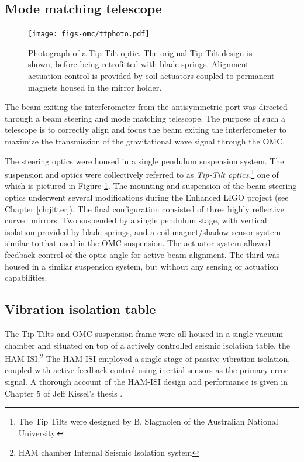 \subsection{Mode matching telescope}
\begin{figure}
  \begin{center}
  \leavevmode
  \texttt{[image: figs-omc/ttphoto.pdf]}
  \end{center}
  \caption[Photograph of a Tip Tilt optic.]{Photograph of a Tip Tilt optic. The original Tip Tilt design is shown, before being retrofitted with blade springs. Alignment actuation control is provided by coil actuators coupled to permanent magnets housed in the mirror holder. }
  \label{fig:ttphoto}
\end{figure}
The beam exiting the interferometer from the antisymmetric port was directed through a beam steering and mode matching telescope. %
The purpose of such a telescope is to correctly align and focus the beam exiting the interferometer to maximize the transmission of the gravitational wave signal through the OMC.

The steering optics were housed in a single pendulum suspension system. %
The suspension and optics were collectively referred to as \emph{Tip-Tilt optics},\footnote{The Tip Tilts were designed by B. %
Slagmolen of the Australian National University\cite{T0900096}.} one of which is pictured in Figure \ref{fig:ttphoto}. %
The mounting and suspension of the beam steering optics underwent several modifications during the Enhanced LIGO project (see Chapter \ref{ch:jitter}). %
The final configuration consisted of three highly reflective curved mirrors. %
Two suspended by a single pendulum stage, with vertical isolation provided by blade springs, and a coil-magnet/shadow sensor system similar to that used in the OMC suspension. %
The actuator system allowed feedback control of the optic angle for active beam alignment. %
The third was housed in a similar suspension system, but without any sensing or actuation capabilities.

\subsection{Vibration isolation table}
The Tip-Tilts and OMC suspension frame were all housed in a single vacuum chamber and situated on top of a actively controlled seismic isolation table, the HAM-ISI.\footnote{HAM chamber Internal Seismic Isolation system} The HAM-ISI employed a single stage of passive vibration isolation, coupled with active feedback control using inertial sensors as the primary error signal. %
A thorough account of the HAM-ISI design and performance is given in Chapter 5 of Jeff Kissel's thesis \cite{kisselthesis}.

